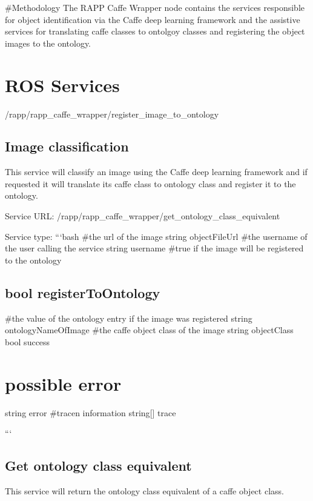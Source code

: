 \#\-Methodology The R\-A\-P\-P Caffe Wrapper node contains the services responsible for object identification via the Caffe deep learning framework and the assistive services for translating caffe classes to ontolgoy classes and registering the object images to the ontology.

\section*{R\-O\-S Services}

/rapp/rapp\-\_\-caffe\-\_\-wrapper/register\-\_\-image\-\_\-to\-\_\-ontology

\subsection*{Image classification}

This service will classify an image using the Caffe deep learning framework and if requested it will translate its caffe class to ontology class and register it to the ontology.

Service U\-R\-L\-: {\ttfamily /rapp/rapp\-\_\-caffe\-\_\-wrapper/get\-\_\-ontology\-\_\-class\-\_\-equivalent}

Service type\-: ```bash \#the url of the image string object\-File\-Url \#the username of the user calling the service string username \#true if the image will be registered to the ontology \subsection*{bool register\-To\-Ontology }

\#the value of the ontology entry if the image was registered string ontology\-Name\-Of\-Image \#the caffe object class of the image string object\-Class bool success \section*{possible error}

string error \#tracen information string\mbox{[}\mbox{]} trace

```

\subsection*{Get ontology class equivalent}

This service will return the ontology class equivalent of a caffe object class.

